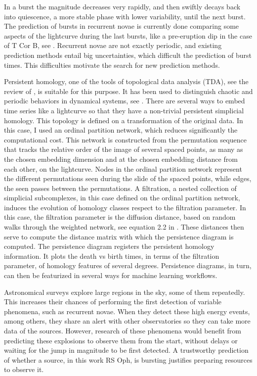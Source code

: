 \documentclass{article}
\begin{document}
In a burst the magnitude decreases very rapidly, and then swiftly decays back into quiescence, a more stable phase with lower variability, until the next burst.
The prediction of bursts in recurrent novae is currently done comparing some aspects of the lightcurve during the last bursts, like a pre-eruption dip in the case of T Cor B, see \cite{schaefer}. Recurrent novae are not exactly periodic, and existing prediction methods entail big uncertainties, which difficult the prediction of burst times. This difficulties motivate the search for new prediction methods.

Persistent homology, one of the tools of topological data analysis (TDA), see the review of \cite{chazal}, is suitable for this purpose. It has been used to distinguish chaotic and periodic behaviors in dynamical systems, see \cite{khasawneh}. There are several ways to embed time series like a lightcurve so that they have a non-trivial persistent simplicial homology. This topology is defined on a transformation of the original data. In this case, I used an ordinal partition network, which reduces significantly the computational cost. This network is constructed from the permutation sequence that tracks the relative order of the image of several spaced points, as many as the chosen embedding dimension and at the chosen embedding distance from each other, on the lightcurve. Nodes in the ordinal partition network represent the different permutations seen during the slide of the spaced points, while edges, the seen passes between the permutations. A filtration, a nested collection of simplicial subcomplexes, in this case defined on the ordinal partition network, induces the evolution of homology classes respect to the filtration parameter. In this case, the filtration parameter is the diffusion distance, based on random walks through the weighted network, see equation 2.2 in \cite{myersweighted}. These distances then serve to compute the distance matrix with which the persistence diagram is computed. The persistence diagram registers the persistent homology information. It plots the death vs birth times, in terms of the filtration parameter, of homology features of several degrees. Persistence diagrams, in turn, can then be featurized in several ways for machine learning workflows.

Astronomical surveys explore large regions in the sky, some of them repeatedly. This increases their chances of performing the first detection of variable phenomena, such as recurrent novae. When they detect these high energy events, among others, they share an alert with other observatories so they can take more data of the sources. However, research of these phenomena would benefit from predicting these explosions to observe them from the start, without delays or waiting for the jump in magnitude to be first detected. A trustworthy prediction of whether a source, in this work RS Oph, is bursting justifies preparing resources to observe it.
\end{document}
